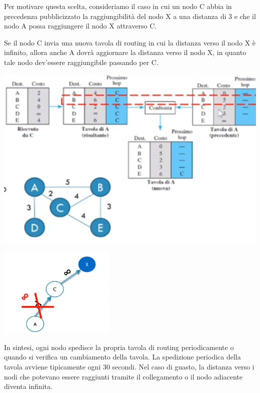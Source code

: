         Per motivare questa scelta, consideriamo il caso in cui un nodo C abbia in precedenza pubblicizzato la raggiungibilità del nodo X a una distanza di 3 e che il nodo A possa raggiungere il nodo X attraverso C.
        
        Se il nodo C invia una nuova tavola di routing in cui la distanza verso il nodo X è infinito, allora anche A dovrà aggiornare la distanza verso il nodo X, in quanto tale nodo dev'essere raggiungibile passando per C.
        
        \begin{center}
            \includegraphics[scale=0.5]{images/Vector4.png}
        \end{center}
        
        \begin{center}
            \includegraphics[scale=0.5]{images/Vector5.png}
        \end{center}
        
        In sintesi, ogni nodo spedisce la propria tavola di routing periodicamente o quando si verifica un cambiamento della tavola. La spedizione periodica della tavola avviene tipicamente ogni 30 secondi. Nel caso di guasto, la distanza verso i nodi che potevano essere raggiunti tramite il collegamento o il nodo adiacente diventa infinita. 
        
